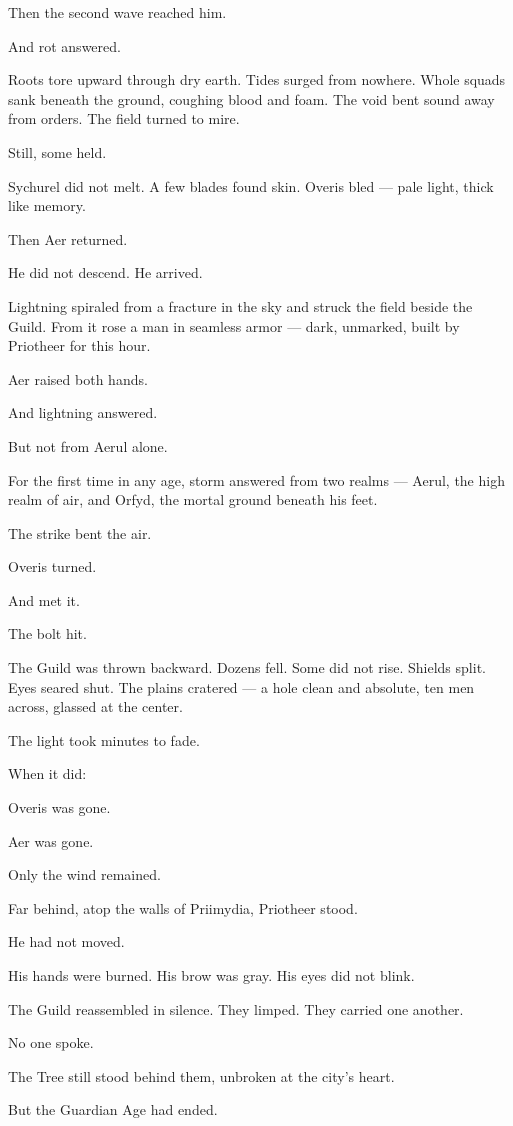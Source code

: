 \documentclass[12pt]{article}
\begin{document}
Then the second wave reached him.

And rot answered.

Roots tore upward through dry earth. Tides surged from nowhere. Whole squads sank beneath the ground, coughing blood and foam. The void bent sound away from orders. The field turned to mire.

Still, some held.

Sychurel did not melt. A few blades found skin. Overis bled — pale light, thick like memory.

Then Aer returned.

He did not descend. He arrived.

Lightning spiraled from a fracture in the sky and struck the field beside the Guild. From it rose a man in seamless armor — dark, unmarked, built by Priotheer for this hour.

Aer raised both hands.

And lightning answered.

But not from Aerul alone.

For the first time in any age, storm answered from two realms — Aerul, the high realm of air, and Orfyd, the mortal ground beneath his feet.

The strike bent the air.

Overis turned.

And met it.

The bolt hit.

The Guild was thrown backward. Dozens fell. Some did not rise. Shields split. Eyes seared shut. The plains cratered — a hole clean and absolute, ten men across, glassed at the center.

The light took minutes to fade.

When it did:

Overis was gone.

Aer was gone.

Only the wind remained.

Far behind, atop the walls of Priimydia, Priotheer stood.

He had not moved.

His hands were burned. His brow was gray. His eyes did not blink.

The Guild reassembled in silence. They limped. They carried one another.

No one spoke.

The Tree still stood behind them, unbroken at the city’s heart.

But the Guardian Age had ended.
\end{document}
